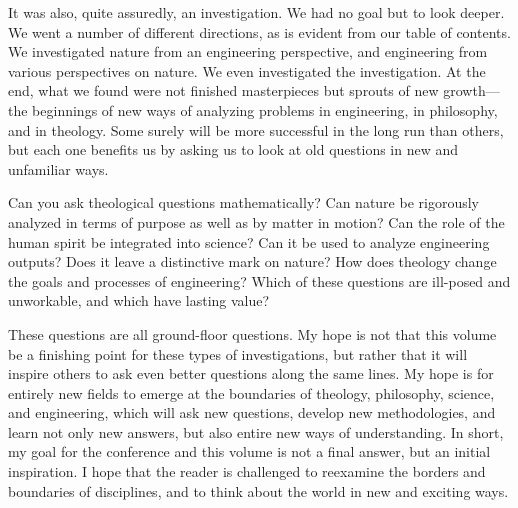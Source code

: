 It was also, quite assuredly, an investigation.  We had no goal but to look deeper.  We went a number of different directions, as is evident from our table of contents.  We investigated nature from an engineering perspective, and engineering from various perspectives on nature.  We even investigated the investigation.  At the end, what
we found were not finished masterpieces but sprouts of new growth---the beginnings of new ways of analyzing problems in engineering, in philosophy, and in theology.  Some surely will be more successful in the long run than others, but each one benefits us by asking us to look at old questions in new and unfamiliar ways.

Can you ask theological questions mathematically?  Can nature be rigorously analyzed in terms of purpose as well as by matter in motion?  Can the role of the human spirit be integrated into science?  Can it be used to analyze engineering outputs?  Does it leave a distinctive mark on nature?  How does theology change the goals and processes of engineering?  Which of these questions are ill-posed and unworkable, and which have lasting value?

These questions are all ground-floor questions.  My hope is not that this volume be a finishing point for these types of investigations, but rather that it will inspire others to ask even better questions along the same lines.  My hope is for entirely new fields to emerge at the boundaries of theology, philosophy, science, and engineering, which will ask new questions, develop new methodologies, and learn not only new answers, but also entire new ways of understanding.  In short, my goal for the conference and this volume is not a final answer, but an initial inspiration.  I hope that the reader is challenged to reexamine the borders and boundaries of disciplines, and to think about the world in new and exciting ways.



